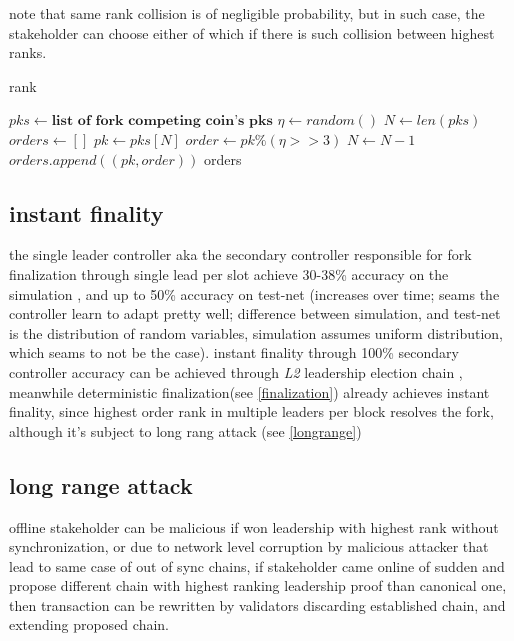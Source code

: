 \documentclass{article}
\begin{document}
note that same rank collision is of negligible probability, but in such case, the stakeholder can choose either of which if there is such collision between highest ranks.


\begin{algorithm}
\caption{rank}\label{alg:cap}
\begin{algorithmic}

\State $pks \gets \textbf{list of fork competing coin's pks}$
\State $\eta \gets random()$ 
\State $N \gets len(pks)$
\State $orders \gets []$
\State $pk \gets pks[N]$
\State $order \gets pk \% (\eta >> 3) $
\State $N \gets N-1$
\State $orders.append((pk,order))$
\EndWhile
\State \Return orders
\end{algorithmic}
\end{algorithm}


\subsection {instant finality}
the single leader controller aka the secondary controller responsible for fork finalization through single lead per slot achieve 30-38\% accuracy on the simulation \cite{lotterysim}, and up to 50\% accuracy on test-net (increases over time; seams the controller learn to adapt pretty well; difference between simulation, and test-net is the distribution of random variables, simulation assumes uniform distribution, which seams to not be the case).
instant finality through 100\% secondary controller accuracy can be achieved through \emph{L2} leadership election chain \cite{khonsu}, meanwhile deterministic finalization(see \ref{finalization}) already achieves instant finality, since highest order rank in multiple leaders per block resolves the fork, although it's subject to long rang attack (see \ref{longrange})


\label{longrange}
\subsection {long range attack}
offline stakeholder can be malicious if won leadership with highest rank without synchronization, or due to network level corruption by malicious attacker that lead to same case of out of sync chains, if stakeholder came online of sudden and propose different chain with highest ranking leadership proof than canonical one, then transaction can be rewritten by validators discarding established chain, and extending proposed chain.
\end{document}
